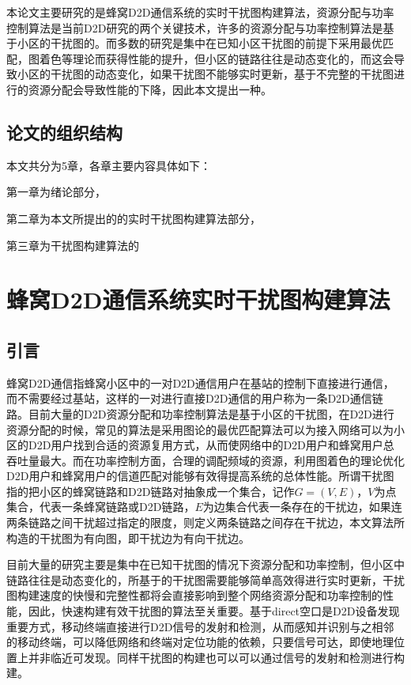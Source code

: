 \documentclass[figurelist,tablelist,algorithmlist,nomlist,masters]{seuthesix}
\begin{document}
	本论文主要研究的是蜂窝D2D通信系统的实时干扰图构建算法，资源分配与功率控制算法是当前D2D研究的两个关键技术，许多的资源分配与功率控制算法是基于小区的干扰图的。而多数的研究是集中在已知小区干扰图的前提下采用最优匹配，图着色等理论而获得性能的提升，但小区的链路往往是动态变化的，而这会导致小区的干扰图的动态变化，如果干扰图不能够实时更新，基于不完整的干扰图进行的资源分配会导致性能的下降，因此本文提出一种。


	\section{论文的组织结构}
	本文共分为5章，各章主要内容具体如下：

	第一章为绪论部分，

	第二章为本文所提出的的实时干扰图构建算法部分，

	第三章为干扰图构建算法的
	
	\chapter{蜂窝D2D通信系统实时干扰图构建算法}
	\section{引言}
	蜂窝D2D通信指蜂窝小区中的一对D2D通信用户在基站的控制下直接进行通信，而不需要经过基站，这样的一对进行直接D2D通信的用户称为一条D2D通信链路。目前大量的D2D资源分配和功率控制算法是基于小区的干扰图，在D2D进行资源分配的时候，常见的算法是采用图论的最优匹配算法可以为接入网络可以为小区的D2D用户找到合适的资源复用方式，从而使网络中的D2D用户和蜂窝用户总吞吐量最大。而在功率控制方面，合理的调配频域的资源，利用图着色的理论优化D2D用户和蜂窝用户的信道匹配对能够有效得提高系统的总体性能。所谓干扰图指的把小区的蜂窝链路和D2D链路对抽象成一个集合，记作$G=(V,E)$，$V$为点集合，代表一条蜂窝链路或D2D链路，$E$为边集合代表一条存在的干扰边，如果连两条链路之间干扰超过指定的限度，则定义两条链路之间存在干扰边，本文算法所构造的干扰图为有向图，即干扰边为有向干扰边。
	
	目前大量的研究主要是集中在已知干扰图的情况下资源分配和功率控制，但小区中链路往往是动态变化的，所基于的干扰图需要能够简单高效得进行实时更新，干扰图构建速度的快慢和完整性都将会直接影响到整个网络资源分配和功率控制的性能，因此，快速构建有效干扰图的算法至关重要。基于direct空口是D2D设备发现重要方式，移动终端直接进行D2D信号的发射和检测，从而感知并识别与之相邻的移动终端，可以降低网络和终端对定位功能的依赖，只要信号可达，即使地理位置上并非临近可发现。同样干扰图的构建也可以可以通过信号的发射和检测进行构建。
	
\end{document}
